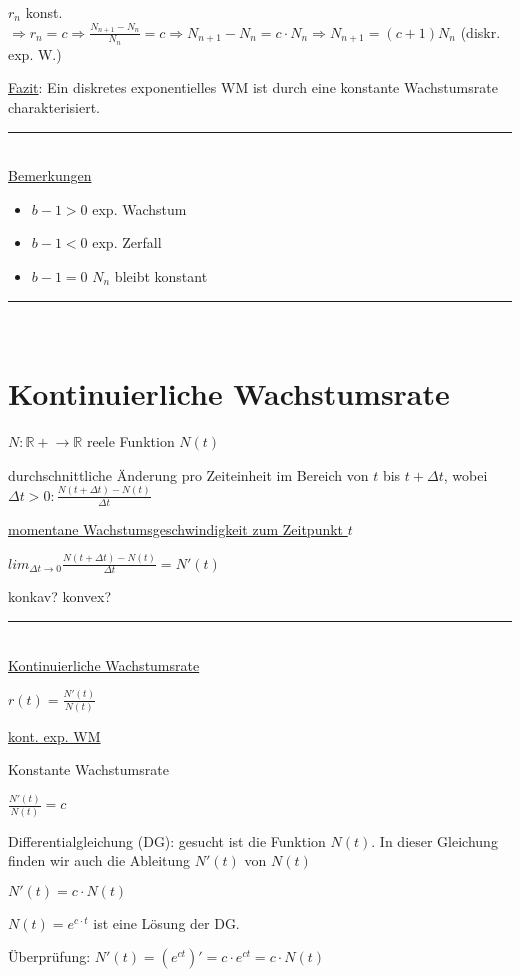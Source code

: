 \documentclass[18pt,a4paper]{scrreprt}
\begin{document}
$r_n$ konst. $\Rightarrow r_n = c \Rightarrow \frac{N_{n+1} - N_n}{N_n} = c \Rightarrow N_{n+1} - N_n = c\cdot N_n \Rightarrow N_{n+1} = (c+1) N_n$ (diskr. exp. W.)

\uline{Fazit}: Ein diskretes exponentielles WM ist durch eine konstante Wachstumsrate charakterisiert.

\rule{\textwidth}{0.4mm}\\

\uline{Bemerkungen}

\begin{itemize}
	\item $b-1 > 0$ exp. Wachstum
	\item $b-1 < 0$ exp. Zerfall
	\item $b-1 = 0$ $N_n$ bleibt konstant
\end{itemize}

\rule{\textwidth}{0.4mm}\\

\section{Kontinuierliche Wachstumsrate}

$N: \mathbb{R+} \rightarrow \mathbb{R}$ reele Funktion $N(t)$

durchschnittliche Änderung pro Zeiteinheit im Bereich von $t$ bis $t+\Delta t$, wobei $\Delta t >0: \frac{N(t+\Delta t) - N(t)}{\Delta t}$

\uline{momentane Wachstumsgeschwindigkeit zum Zeitpunkt $t$}

$lim_{\Delta t \to 0}\frac{N(t+\Delta t) - N(t)}{\Delta t} = N'(t)$

konkav? konvex?

\rule{\textwidth}{0.4mm}\\

\uline{Kontinuierliche Wachstumsrate}

$r(t) = \frac{N'(t)}{N(t)}$

\uline{kont. exp. WM}

Konstante Wachstumsrate

$\frac{N'(t)}{N(t)} = c$

Differentialgleichung (DG): gesucht ist die Funktion $N(t)$. In dieser Gleichung finden wir auch die Ableitung $N'(t)$ von $N(t)$

$N'(t) = c\cdot N(t)$

$N(t) = e^{c\cdot t}$ ist eine Lösung der DG. 

Überprüfung: $N'(t) = (e^{c t})' = c\cdot e^{c t} = c \cdot N(t)$ \checkmark
\end{document}
